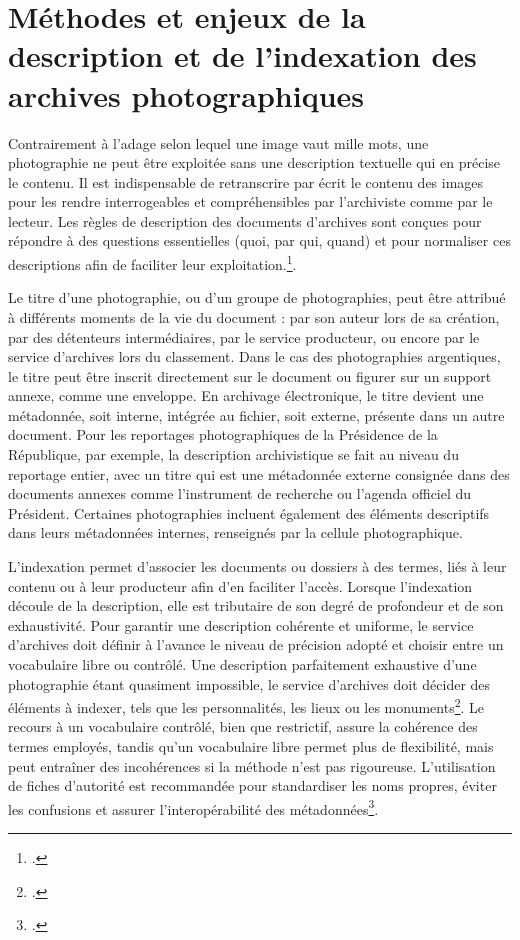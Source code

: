 \section{Méthodes et enjeux de la description et de l'indexation des archives photographiques}

Contrairement à l’adage selon lequel une image vaut mille mots, une photographie ne peut être exploitée sans une description textuelle qui en précise le contenu. Il est indispensable de retranscrire par écrit le contenu des images pour les rendre interrogeables et compréhensibles par l’archiviste comme par le lecteur. Les règles de description des documents d’archives sont conçues pour répondre à des questions essentielles (quoi, par qui, quand) et pour normaliser ces descriptions afin de faciliter leur exploitation.\footcite[pp.102-103]{charbonneauGestionArchivesPhotographiques2001}. 

Le titre d’une photographie, ou d’un groupe de photographies, peut être attribué à différents moments de la vie du document : par son auteur lors de sa création, par des détenteurs intermédiaires, par le service producteur, ou encore par le service d’archives lors du classement. Dans le cas des photographies argentiques, le titre peut être inscrit directement sur le document ou figurer sur un support annexe, comme une enveloppe. En archivage électronique, le titre devient une métadonnée, soit interne, intégrée au fichier, soit externe, présente dans un autre document. Pour les reportages photographiques de la Présidence de la République, par exemple, la description archivistique se fait au niveau du reportage entier, avec un titre qui est une métadonnée externe consignée dans des documents annexes comme l’instrument de recherche ou l’agenda officiel du Président. Certaines photographies incluent également des éléments descriptifs dans leurs métadonnées internes, renseignés par la cellule photographique.

L’indexation permet d’associer les documents ou dossiers à des termes, liés à leur contenu ou à leur producteur afin d’en faciliter l’accès. Lorsque l’indexation découle de la description, elle est tributaire de son degré de profondeur et de son exhaustivité. Pour garantir une description cohérente et uniforme, le service d’archives doit définir à l’avance le niveau de précision adopté et choisir entre un vocabulaire libre ou contrôlé.  Une description parfaitement exhaustive d’une photographie étant quasiment impossible, le service d’archives doit décider des éléments à indexer, tels que les personnalités, les lieux ou les monuments\footcite[p.155]{charbonneauGestionArchivesPhotographiques2001}. Le recours à un vocabulaire contrôlé, bien que restrictif, assure la cohérence des termes employés, tandis qu’un vocabulaire libre permet plus de flexibilité, mais peut entraîner des incohérences si la méthode n’est pas rigoureuse. L’utilisation de fiches d’autorité est recommandée pour standardiser les noms propres, éviter les confusions et assurer l’interopérabilité des métadonnées\footcite[pp.158-170]{charbonneauGestionArchivesPhotographiques2001}.

